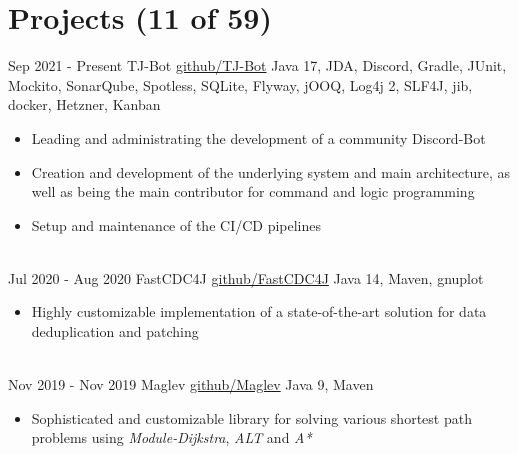 \documentclass[letterpaper]{twentysecondcv} %
\begin{document}
\section{Projects (11 of 59)}
\begin{twenty} %
	\twentyitem
    		{Sep 2021 -}
		{Present}
        		{TJ-Bot}
        		{\href{https://github.com/Together-Java/TJ-Bot}{github/TJ-Bot}}
        		{Java 17, JDA, Discord, Gradle, JUnit, Mockito, SonarQube, Spotless, SQLite, Flyway, jOOQ, Log4j 2, SLF4J, jib, docker, Hetzner, Kanban}
        		{\begin{itemize}
        			\item Leading and administrating the development of a community Discord-Bot
        			\item Creation and development of the underlying system and main architecture,
        			as well as being the main contributor for command and logic programming
        			\item Setup and maintenance of the CI/CD pipelines
        		\end{itemize}}\\
	\twentyitem
    		{Jul 2020 -}
		{Aug 2020}
        		{FastCDC4J}
        		{\href{https://github.com/Zabuzard/FastCDC4J}{github/FastCDC4J}}
        		{Java 14, Maven, gnuplot}
        		{\begin{itemize}
        			\item Highly customizable implementation of a state-of-the-art solution for data deduplication and patching
        		\end{itemize}}\\
	\twentyitem
    		{Nov 2019 -}
		{Nov 2019}
        		{Maglev}
        		{\href{https://github.com/Zabuzard/Maglev}{github/Maglev}}
        		{Java 9, Maven}
        		{\begin{itemize}
        			\item Sophisticated and customizable library for solving various shortest path problems using \textit{Module-Dijkstra}, \textit{ALT} and \textit{A*}
        		\end{itemize}}
\end{twenty}

\newpage

\makesidebarThird %

\vspace{10mm}
\end{document}
